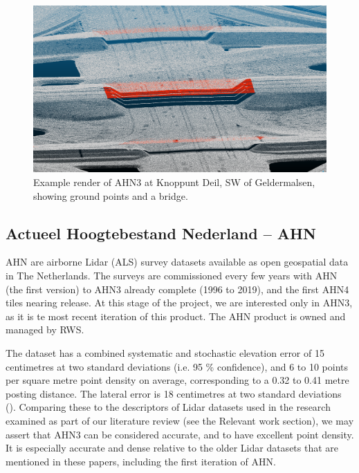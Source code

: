 \begin{figure}[ht]
    \centering
    \includegraphics[width=\linewidth]{final_report/figs/ahn_sample_01.png} 
    \caption{Example render of AHN3 at Knoppunt Deil, SW of Geldermalsen, showing ground points and a bridge.}
    \label{fig:ahnbridges}
\end{figure}

\subsection{Actueel Hoogtebestand Nederland – AHN}
\label{sub:ahn}

AHN are airborne Lidar (ALS) survey datasets available as open geospatial data in The Netherlands. The surveys are commissioned every few years with AHN (the first version) to AHN3 already complete (1996 to 2019), and the first AHN4 tiles nearing release. At this stage of the project, we are interested only in AHN3, as it is te most recent iteration of this product. The AHN product is owned and managed by RWS.

The dataset has a combined systematic and stochastic elevation error of 15 centimetres at two standard deviations (i.e. 95 \% confidence), and 6 to 10 points per square metre point density on average, corresponding to a 0.32 to 0.41 metre posting distance. The lateral error is 18 centimetres at two standard deviations (\cite{ahn_kwaliteit}). Comparing these to the descriptors of Lidar datasets used in the research examined as part of our literature review (see the Relevant work section), we may assert that AHN3 can be considered accurate, and to have excellent point density. It is especially accurate and dense relative to the older Lidar datasets that are mentioned in these papers, including the first iteration of AHN.

